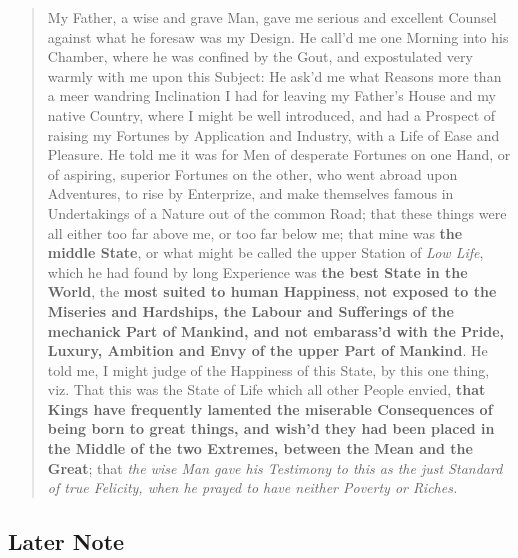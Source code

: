 \documentclass[a4paper]{article}
\begin{document}
\noindent
\begin{minipage}{1\textwidth}
\vspace{1em}
\begin{quotation}
{\ttfamily

My Father, a wise and grave Man, gave me serious and excellent Counsel against what he foresaw was my Design. He call’d me one Morning into his Chamber, where he was confined by the Gout, and expostulated very warmly with me upon this Subject: He ask’d me what Reasons more than a meer wandring Inclination I had for leaving my Father’s House and my native Country, where I might be well introduced, and had a Prospect of raising my Fortunes by Application and Industry, with a Life of Ease and Pleasure. He told me it was for Men of desperate Fortunes on one Hand, or of aspiring, superior Fortunes on the other, who went abroad upon Adventures, to rise by Enterprize, and make themselves famous in Undertakings of a Nature out of the common Road; that these things were all either too far above me, or too far below me; that mine was \textbf{the middle State}, or what might be called the upper Station of \textit{Low Life}, which he had found by long Experience was \textbf{the best State in the World}, the \textbf{most suited to human Happiness}, \textbf{not exposed to the Miseries and Hardships, the Labour and Sufferings of the mechanick Part of Mankind, and not embarass’d with the Pride, Luxury, Ambition and Envy of the upper Part of Mankind}. He told me, I might judge of the Happiness of this State, by this one thing, viz. That this was the State of Life which all other People envied, \textbf{that Kings have frequently lamented the miserable Consequences of being born to great things, and wish’d they had been placed in the Middle of the two Extremes, between the Mean and the Great}; that \textit{the wise Man gave his Testimony to this as the just Standard of true Felicity, when he prayed to have neither Poverty or Riches.}

}
\end{quotation}
\vspace{1em}
\end{minipage}


\subsection{Later Note}
\end{document}

